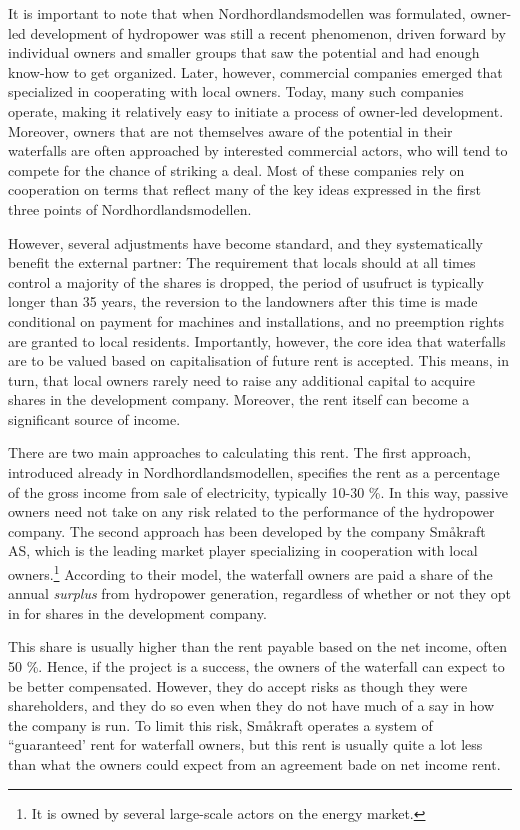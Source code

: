 It is important to note that when Nordhordlandsmodellen was formulated, owner-led development of hydropower was still a recent phenomenon, driven forward by individual owners and smaller groups that saw the potential and had enough know-how to get organized. Later, however, commercial companies emerged that specialized in cooperating with local owners. Today, many such companies operate, making it relatively easy to initiate a process of owner-led development. Moreover, owners that are not themselves aware of the potential in their waterfalls are often approached by interested commercial actors, who will tend to compete for the chance of striking a deal. Most of these companies rely on cooperation on terms that reflect many of the key ideas expressed in the first three points of Nordhordlandsmodellen.

However, several adjustments have become standard, and they systematically benefit the external partner: The requirement that locals should at all times control a majority of the shares is dropped, the period of usufruct is typically longer than 35 years, the reversion to the landowners after this time is made conditional on payment for machines and installations, and no preemption rights are granted to local residents. Importantly, however, the core idea that waterfalls are to be valued based on capitalisation of future rent is accepted. This means, in turn, that local owners rarely need to raise any additional capital to acquire shares in the development company. Moreover, the rent itself can become a significant source of income. 

There are two main approaches to calculating this rent. The first approach, introduced already in Nordhordlandsmodellen, specifies the rent as a percentage of the gross income from sale of electricity, typically 10-30 \%. In this way, passive owners need not take on any risk related to the performance of the hydropower company. The second approach has been developed by the company Småkraft AS, which is the leading market player specializing in cooperation with local owners.\footnote{It is owned by several large-scale actors on the energy market.} According to their model, the waterfall owners are paid a share of the annual {\it surplus} from hydropower generation, regardless of whether or not they opt in for shares in the development company. 

This share is usually higher than the rent payable based on the net income, often 50 \%. Hence, if the project is a success, the owners of the waterfall can expect to be better compensated. However, they do accept risks as though they were shareholders, and they do so even when they do not have much of a say in how the company is run. To limit this risk, Småkraft operates a system of ``guaranteed' rent for waterfall owners, but this rent is usually quite a lot less than what the owners could expect from an agreement bade on net income rent.

